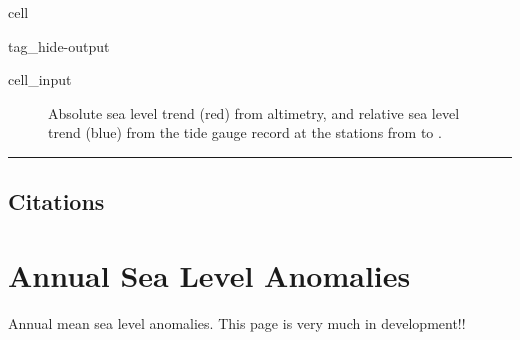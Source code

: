 \documentclass[letterpaper,10pt,english]{jupyterBook}
\begin{document}
\begin{sphinxuseclass}{cell}
\begin{sphinxuseclass}{tag_hide-output}
\begin{sphinxVerbatimInput}
\begin{sphinxuseclass}{cell_input}
\begin{sphinxVerbatim}[commandchars=\\\{\}]
  

    
  
\end{sphinxVerbatim}

\end{sphinxuseclass}\end{sphinxVerbatimInput}

\end{sphinxuseclass}
\end{sphinxuseclass}
\begin{figure}[htbp]
\centering
\capstart

\noindent{}
\caption{Absolute sea level trend (red) from altimetry, and relative sea level trend (blue) from the tide gauge record at the  stations from  to .}\label{\detokenize{notebooks/regional_and_local/SL_Trend:trend-fig}}\end{figure}


\bigskip\hrule\bigskip



\chapter{Citations}
\label{\detokenize{notebooks/regional_and_local/SL_Trend:citations}}
\sphinxstepscope


\part{Annual Sea Level Anomalies}
\label{\detokenize{notebooks/regional_and_local/SL_anomaly_annual:annual-sea-level-anomalies}}\label{\detokenize{notebooks/regional_and_local/SL_anomaly_annual::doc}}
\sphinxAtStartPar
Annual mean sea level anomalies. This page is very much in development!!
\end{document}
